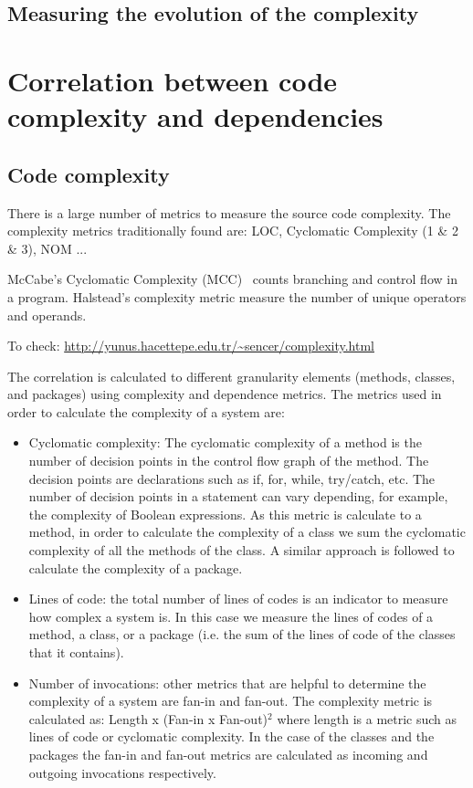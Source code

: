 \documentclass{sig-alternate}
\begin{document}
\subsection{Measuring the evolution of the complexity}


\section{Correlation between code complexity and dependencies}






\subsection{Code complexity}
There is a large number of metrics to measure the source code complexity.
The complexity metrics traditionally found are: LOC, Cyclomatic Complexity (1 \& 2 \& 3), NOM ...

McCabe's Cyclomatic Complexity (MCC)~\cite{McCa76a} counts branching and control flow in a program.
Halstead's complexity metric measure the number of unique operators and operands. 


To check: \url{http://yunus.hacettepe.edu.tr/~sencer/complexity.html}


The correlation is calculated to different granularity elements (methods, classes, and packages) using complexity and dependence metrics. The metrics used in order to calculate the complexity of a system are:
\begin{itemize}%
\item Cyclomatic complexity: The cyclomatic complexity of a method is the number of decision points in the control flow graph of the method. The decision points are declarations such as if, for, while, try/catch, etc. The number of decision points in a statement can vary depending, for example, the complexity of Boolean expressions. As this metric is calculate to a method, in order to calculate the complexity of a class we sum the cyclomatic complexity of all the methods of the class. A similar approach is followed to calculate the complexity of a package. 
\item Lines of code: the total number of lines of codes is an indicator to measure how complex a system is. In this case we measure the lines of codes of a method, a class, or a package (i.e. the sum of the lines of code of the classes that it contains).
\item Number of invocations: other metrics that are helpful to determine the complexity of a system are fan-in and fan-out. The complexity metric is calculated as: Length x (Fan-in x Fan-out)$^{2}$ where length is a metric such as lines of code or cyclomatic complexity. In the case of the classes and the packages the fan-in and fan-out metrics are calculated as incoming and outgoing invocations respectively.
\end{itemize}
\end{document}
